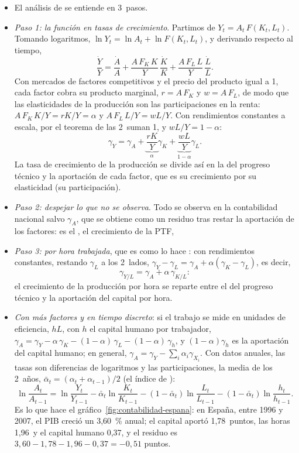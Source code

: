 \documentclass[11pt]{article}
\begin{document}
\begin{itemize}
\item El análisis de  se entiende en 3~pasos.
\item \emph{Paso 1: la función en tasas de crecimiento}. Partimos de $Y_t=A_t\,F(K_t,L_t)$. Tomando logaritmos, $\ln Y_t=\ln A_t+\ln F(K_t,L_t)$, y derivando respecto al tiempo,
  \[
  \frac{\dot Y}{Y}=\frac{\dot A}{A}+\frac{A\,F_K\,K}{Y}\,\frac{\dot K}{K}+\frac{A\,F_L\,L}{Y}\,\frac{\dot L}{L}.
  \]
  Con mercados de factores competitivos y el precio del producto igual a 1, cada factor cobra su producto marginal, $r=A\,F_K$ y $w=A\,F_L$, de modo que las elasticidades de la producción son las participaciones en la renta: $A\,F_K\,K/Y=rK/Y=\alpha$ y $A\,F_L\,L/Y=wL/Y$. Con rendimientos constantes a escala, por el teorema de  las 2~suman 1, y $wL/Y=1-\alpha$:
  \[
  \gamma_Y=\gamma_A+\underbrace{\frac{rK}{Y}}_{\alpha}\gamma_K+\underbrace{\frac{wL}{Y}}_{1-\alpha}\gamma_L .
  \]
  La tasa de crecimiento de la producción se divide así en la del progreso técnico y la aportación de cada factor, que es su crecimiento por su elasticidad (su participación).
\item \emph{Paso 2: despejar lo que no se observa}. Todo se observa en la contabilidad nacional salvo $\gamma_A$, que se obtiene como un residuo tras restar la aportación de los factores: es el , el crecimiento de la PTF,
\item \emph{Paso 3: por hora trabajada}, que es como lo hace : con rendimientos constantes, restando $\gamma_L$ a los 2~lados, $\gamma_Y-\gamma_L=\gamma_A+\alpha(\gamma_K-\gamma_L)$, es decir,
  \begin{equation}
  \gamma_{Y/L}=\gamma_A+\alpha\,\gamma_{K/L}:\label{eq:residuo-hora}
  \end{equation}
  el crecimiento de la producción por hora se reparte entre el del progreso técnico y la aportación del capital por hora.
\item \emph{Con más factores y en tiempo discreto}: si el trabajo se mide en unidades de eficiencia, $hL$, con $h$ el capital humano por trabajador, $\gamma_A=\gamma_Y-\alpha\,\gamma_K-(1-\alpha)\,\gamma_L-(1-\alpha)\,\gamma_h$, y $(1-\alpha)\gamma_h$ es la aportación del capital humano; en general, $\gamma_A=\gamma_Y-\sum_i\alpha_i\gamma_{X_i}$. Con datos anuales, las tasas son diferencias de logaritmos y las participaciones, la media de los 2~años, $\bar\alpha_t=(\alpha_t+\alpha_{t-1})/2$ (el índice de ):
  \[
  \ln\frac{A_t}{A_{t-1}}=\ln\frac{Y_t}{Y_{t-1}}-\bar\alpha_t\ln\frac{K_t}{K_{t-1}}-(1-\bar\alpha_t)\ln\frac{L_t}{L_{t-1}}-(1-\bar\alpha_t)\ln\frac{h_t}{h_{t-1}} .
  \]
  Es lo que hace el gráfico~\ref{fig:contabilidad-espana}: en España, entre 1996 y 2007, el PIB creció un 3,60~\% anual; el capital aportó 1,78~puntos, las horas 1,96~y el capital humano 0,37, y el residuo es $3{,}60-1{,}78-1{,}96-0{,}37=-0{,}51$ puntos\nocite{CE2026AMECO,GGDC2025PWT}.
\end{itemize}
\end{document}
